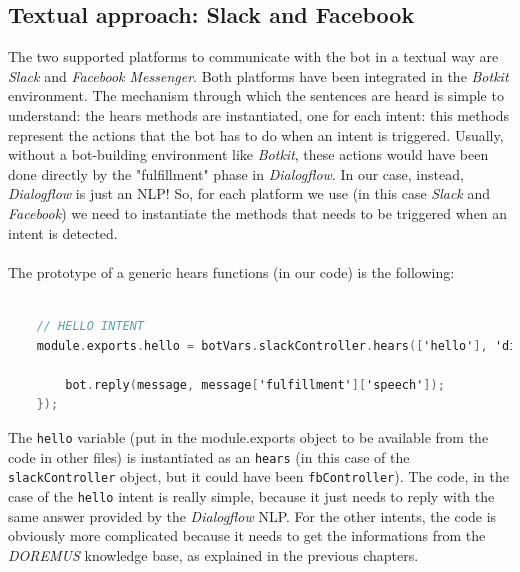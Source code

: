 \documentclass[a4paper,12pt]{report}
\begin{document}
	\subsection{Textual approach: Slack and Facebook}
	The two supported platforms to communicate with the bot in a textual way are \textit{Slack} and \textit{Facebook Messenger}. Both platforms have been integrated in the \textit{Botkit} environment. The mechanism through which the sentences are heard is simple to understand: the hears methods are instantiated, one for each intent: this methods represent the actions that the bot has to do when an intent is triggered. Usually, without a bot-building environment like \textit{Botkit}, these actions would have been done directly by the "fulfillment" phase in \textit{Dialogflow}. In our case, instead, \textit{Dialogflow} is just an NLP! So, for each platform we use (in this case \textit{Slack} and \textit{Facebook}) we need to instantiate the methods that needs to be triggered when an intent is detected.\\\\
	The prototype of a generic hears functions (in our code) is the following:
	\begin{lstlisting}[language=C]
	
	// HELLO INTENT
	module.exports.hello = botVars.slackController.hears(['hello'], 'direct_message, direct_mention, mention', botVars.dialogflowMiddleware.hears, function(bot, message) {
	
		bot.reply(message, message['fulfillment']['speech']);
	});
	\end{lstlisting}
	The \texttt{hello} variable (put in the module.exports object to be available from the code in other files) is instantiated as an \texttt{hears} (in this case of the \texttt{slackController} object, but it could have been \texttt{fbController}). The code, in the case of the \texttt{hello} intent is really simple, because it just needs to reply with the same answer provided by the \textit{Dialogflow} NLP. For the other intents, the code is obviously more complicated because it needs to get the informations from the \textit{DOREMUS} knowledge base, as explained in the previous chapters.\\\\
	
\end{document}
